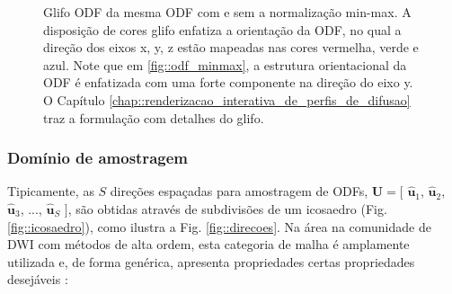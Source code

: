 \documentclass[
    12pt,                %
    oneside,            %
    a4paper,            %
    english,            %
    french,                %
    spanish,            %
    brazil                %
    ]{abntex2}
\begin{document}
\begin{figure}[ht]
\centering
\captionsetup[subfloat]{farskip=0pt,nearskip=0pt}
\centering
    \hspace{1em}
     \caption{Glifo ODF da mesma ODF com e sem a normalização min-max. A disposição de cores glifo enfatiza a orientação da ODF, no qual a direção dos eixos x, y, z estão mapeadas nas cores vermelha, verde e azul. Note que em \ref{fig::odf_minmax}, a estrutura orientacional da ODF é enfatizada com uma forte componente na direção do eixo y. O Capítulo \ref{chap::renderizacao_interativa_de_perfis_de_difusao} traz a formulação com detalhes do glifo.}
    \label{fig::normalizacao_min_max}
\end{figure}

\subsubsection{Domínio de amostragem}
\label{ssec::dominio_esferico}

Tipicamente, as $S$ direções espaçadas para amostragem de ODFs,
$\mathbf{U} = [$
$\mathbf{\hat{u}}_1$, 
$\mathbf{\hat{u}}_2$, 
$\mathbf{\hat{u}}_3$, ..., 
$\mathbf{\hat{u}}_S$ 
$]$, são obtidas através de subdivisões de um icosaedro (Fig. \ref{fig::icosaedro}), como ilustra a Fig. \ref{fig::direcoes}. Na área na comunidade de DWI com métodos de alta ordem, esta categoria de malha é amplamente utilizada \cite{yeh2010, TuchQBall2004, descoteaux2007} e, de forma genérica, apresenta propriedades certas propriedades desejáveis  \cite{popko2012}:
\end{document}
